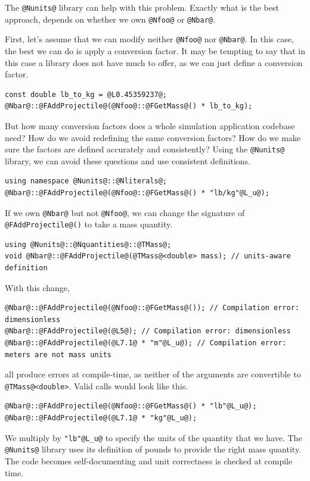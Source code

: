 \documentclass[11pt,letterpaper]{article}
\makeatletter
\newcommand{\lib}{\lstinline{@Nunits@} library}
\makeatother
\begin{document}
The \lib{} can help with this problem.
Exactly what is the best approach, depends on whether we own
\lstinline{@Nfoo@} or \lstinline{@Nbar@}.

First, let's assume that we can modify neither
\lstinline{@Nfoo@} nor \lstinline{@Nbar@}.
In this case, the best we can do is apply a conversion factor.
It may be tempting to say that in this case a library does not have much to offer, as we can just
define a conversion factor.
%
\begin{lstlisting}
const double lb_to_kg = @L0.45359237@;
@Nbar@::@FAddProjectile@(@Nfoo@::@FGetMass@() * lb_to_kg);
\end{lstlisting}
%
But how many conversion factors does a whole simulation application codebase need?
How do we avoid redefining the same conversion factors?
How do we make sure the factors are defined accurately and consistently?
Using the \lib, we can avoid these questions and use consistent definitions.
%
\begin{lstlisting}
using namespace @Nunits@::@Nliterals@;
@Nbar@::@FAddProjectile@(@Nfoo@::@FGetMass@() * "lb/kg"@L_u@);
\end{lstlisting}

If we own \lstinline{@Nbar@} but not \lstinline{@Nfoo@}, we can change the signature of
\lstinline{@FAddProjectile@()} to take a mass quantity.
%
\begin{lstlisting}
using @Nunits@::@Nquantities@::@TMass@;
void @Nbar@::@FAddProjectile@(@TMass@<double> mass); // units-aware definition
\end{lstlisting}
%
With this change,
%
\begin{lstlisting}
@Nbar@::@FAddProjectile@(@Nfoo@::@FGetMass@()); // Compilation error: dimensionless
@Nbar@::@FAddProjectile@(@L5@); // Compilation error: dimensionless
@Nbar@::@FAddProjectile@(@L7.1@ * "m"@L_u@); // Compilation error: meters are not mass units
\end{lstlisting}
%
all produce errors at compile-time, as neither of the arguments are convertible to
\lstinline{@TMass@<double>}.
Valid calls would look like this.
%
\begin{lstlisting}
@Nbar@::@FAddProjectile@(@Nfoo@::@FGetMass@() * "lb"@L_u@);
@Nbar@::@FAddProjectile@(@L7.1@ * "kg"@L_u@);
\end{lstlisting}
%
We multiply by \lstinline{"lb"@L_u@} to specify the units of the quantity that we have.
The \lib{} uses its definition of pounds to provide the right mass quantity.
The code becomes self-documenting and unit correctness is checked at compile time.
\end{document}
